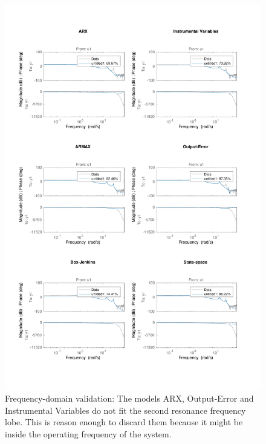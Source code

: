 \documentclass[a4paper,11pt]{article}
\begin{document}
\begin{figure}[H]
\centering
\includegraphics[width = 16cm]{images/4_freq_domain_valid}
\caption{Frequency-domain validation: The models ARX, Output-Error and Instrumental Variables do not fit the second resonance frequency lobe. This is reason enough to discard them because it might be inside the operating frequency of the system.}
\label{fig:freq_valid}
\end{figure}
\end{document}
